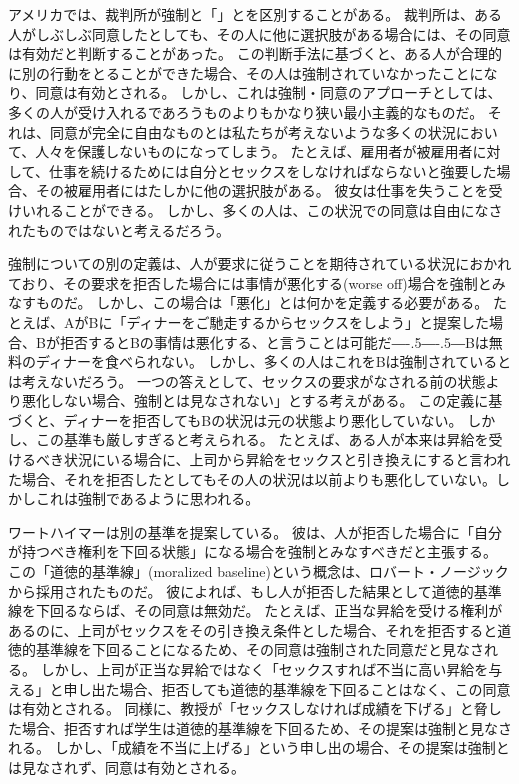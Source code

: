\documentclass[paper=a4,book,openany]{jlreq}
\newcommand{\ig}[1]{}           %
\def\DDASH{―\kern-.5\zw―\kern-.5\zw―} %
\begin{document}
アメリカでは、裁判所が強制と「」とを区別することがある。
裁判所は、ある人がしぶしぶ同意したとしても、その人に他に選択肢がある場合には、その同意は有効だと判断することがあった\citep[p.130]{buchhandler-raphael11:_failur_consen}。
この判断手法に基づくと、ある人が合理的に別の行動をとることができた場合、その人は強制されていなかったことになり、同意は有効とされる。
しかし、これは強制・同意のアプローチとしては、多くの人が受け入れるであろうものよりもかなり狭い最小主義的なものだ。
それは、同意が完全に自由なものとは私たちが考えないような多くの状況において、人々を保護しないものになってしまう。
たとえば、雇用者が被雇用者に対して、仕事を続けるためには自分とセックスをしなければならないと強要した場合、その被雇用者にはたしかに他の選択肢がある。
彼女は仕事を失うことを受けいれることができる。
しかし、多くの人は、この状況での同意は自由になされたものではないと考えるだろう。

強制についての別の定義は、人が要求に従うことを期待されている状況におかれており、その要求を拒否した場合には事情が悪化する(worse off)場合を強制とみなすものだ。
しかし、この場合は「悪化」とは何かを定義する必要がある。
たとえば、AがBに「ディナーをご馳走するからセックスをしよう」と提案した場合、Bが拒否するとBの事情は悪化する、と言うことは可能だ{\DDASH}Bは無料のディナーを食べられない。
しかし、多くの人はこれをBは強制されているとは考えないだろう。
一つの答えとして、セックスの要求がなされる前の状態より悪化しない場合、強制とは見なされない」とする考えがある。
この定義に基づくと、ディナーを拒否してもBの状況は元の状態より悪化していない。
しかし、この基準も厳しすぎると考えられる。
たとえば、ある人が本来は昇給を受けるべき状況にいる場合に、上司から昇給をセックスと引き換えにすると言われた場合、それを拒否したとしてもその人の状況は以前よりも悪化していない。しかしこれは強制であるように思われる。

ワートハイマーは別の基準を提案している。
彼は、人が拒否した場合に「自分が持つべき権利を下回る状態」になる場合を強制とみなすべきだと主張する。
この「道徳的基準線」(moralized baseline)という概念は、ロバート・ノージック\ig{Robert Nozick}から採用されたものだ。
彼によれば、もし人が拒否した結果として道徳的基準線を下回るならば、その同意は無効だ\citep[pp.167--169]{wertheimer03:_consen_sexual_relat}。
たとえば、正当な昇給を受ける権利があるのに、上司がセックスをその引き換え条件とした場合、それを拒否すると道徳的基準線を下回ることになるため、その同意は強制された同意だと見なされる。
しかし、上司が正当な昇給ではなく「セックスすれば不当に高い昇給を与える」と申し出た場合、拒否しても道徳的基準線を下回ることはなく、この同意は有効とされる。
同様に、教授が「セックスしなければ成績を下げる」と脅した場合、拒否すれば学生は道徳的基準線を下回るため、その提案は強制と見なされる。
しかし、「成績を不当に上げる」という申し出の場合、その提案は強制とは見なされず、同意は有効とされる。
\end{document}

